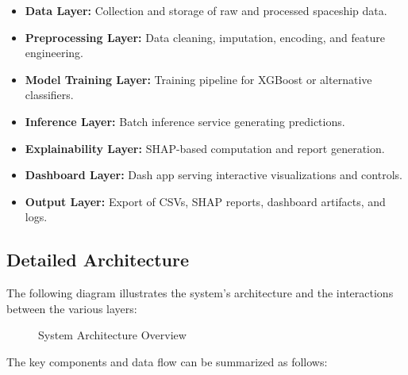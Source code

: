 \documentclass[15pt]{article}
\begin{document}
\begin{itemize}
    \item \textbf{Data Layer:} Collection and storage of raw and processed spaceship data.
    \item \textbf{Preprocessing Layer:} Data cleaning, imputation, encoding, and feature engineering.
    \item \textbf{Model Training Layer:} Training pipeline for XGBoost or alternative classifiers.
    \item \textbf{Inference Layer:} Batch inference service generating predictions.
    \item \textbf{Explainability Layer:} SHAP-based computation and report generation.
    \item \textbf{Dashboard Layer:} Dash app serving interactive visualizations and controls.
    \item \textbf{Output Layer:} Export of CSVs, SHAP reports, dashboard artifacts, and logs.
\end{itemize}

\subsection{Detailed Architecture}

The following diagram illustrates the system's architecture and the interactions between the various layers:

\begin{figure}[h!]
    \centering
    \caption{System Architecture Overview}
    \label{fig:architecture}
\end{figure}

The key components and data flow can be summarized as follows:
\end{document}
